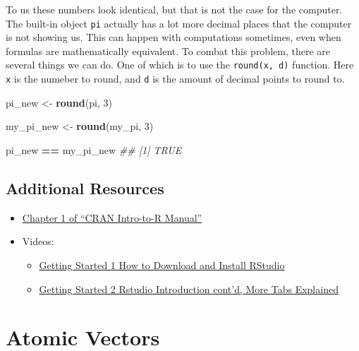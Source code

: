 \documentclass[
]{book}
\newenvironment{Shaded}{\begin{snugshade}}{\end{snugshade}}
\newcommand{\CommentTok}[1]{\textcolor[rgb]{0.56,0.35,0.01}{\textit{#1}}}
\newcommand{\DecValTok}[1]{\textcolor[rgb]{0.00,0.00,0.81}{#1}}
\newcommand{\KeywordTok}[1]{\textcolor[rgb]{0.13,0.29,0.53}{\textbf{#1}}}
\newcommand{\NormalTok}[1]{#1}
\newcommand{\OperatorTok}[1]{\textcolor[rgb]{0.81,0.36,0.00}{\textbf{#1}}}
\newcommand{\StringTok}[1]{\textcolor[rgb]{0.31,0.60,0.02}{#1}}
\providecommand{\tightlist}{%
  \setlength{\itemsep}{0pt}\setlength{\parskip}{0pt}}
\begin{document}
To us these numbers look identical, but that is not the case for the computer. The built-in object \texttt{pi} actually has a lot more decimal places that the computer is not showing us. This can happen with computations sometimes, even when formulas are mathematically equivalent. To combat this problem, there are several things we can do. One of which is to use the \texttt{round(x,\ d)} function. Here \texttt{x} is the numeber to round, and \texttt{d} is the amount of decimal points to round to.

\begin{Shaded}
\begin{Highlighting}[]
\NormalTok{pi_new <-}\StringTok{ }\KeywordTok{round}\NormalTok{(pi, }\DecValTok{3}\NormalTok{)}

\NormalTok{my_pi_new <-}\StringTok{ }\KeywordTok{round}\NormalTok{(my_pi, }\DecValTok{3}\NormalTok{)}

\NormalTok{pi_new }\OperatorTok{==}\StringTok{ }\NormalTok{my_pi_new}
\CommentTok{## [1] TRUE}
\end{Highlighting}
\end{Shaded}

\hypertarget{additional-resources}{%
\section*{Additional Resources}\label{additional-resources}}

\begin{itemize}
\tightlist
\item
  \href{https://cran.r-project.org/doc/manuals/r-release/R-intro.pdf}{Chapter 1 of ``CRAN Intro-to-R Manual''}
\item
  Videos:

  \begin{itemize}
  \tightlist
  \item
    \href{https://ucr.yuja.com/V/Video?v=2365045\&node=8476457\&a=437885577\&autoplay=1}{Getting Started 1 \textbar{} How to Download and Install RStudio}
  \item
    \href{https://ucr.yuja.com/V/Video?v=2368643\&node=8487538\&a=437248619\&autoplay=1}{Getting Started 2 \textbar{} Rstudio Introduction cont'd, More Tabs Explained}
  \end{itemize}
\end{itemize}

\hypertarget{atomic-vectors}{%
\chapter{Atomic Vectors}\label{atomic-vectors}}
\end{document}

